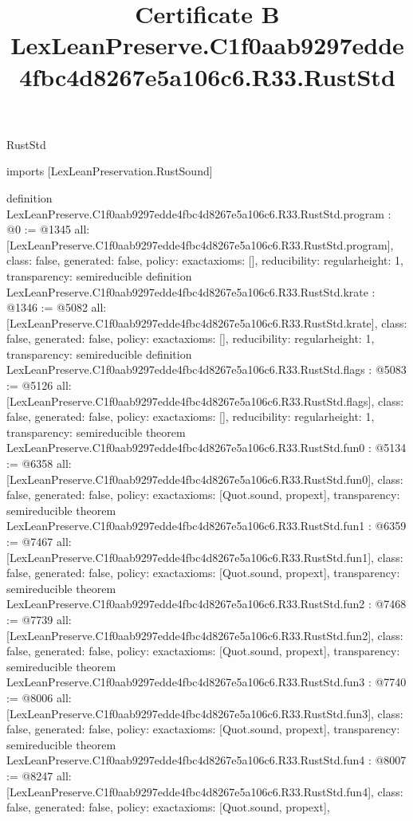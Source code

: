 \begin{lexlean}{RustStd}
\title{Certificate B LexLeanPreserve.C1f0aab9297edde4fbc4d8267e5a106c6.R33.RustStd}
\begin{coremodule}
imports [LexLeanPreservation.RustSound]

definition LexLeanPreserve.C1f0aab9297edde4fbc4d8267e5a106c6.R33.RustStd.program : @0 := @1345 {
  all: [LexLeanPreserve.C1f0aab9297edde4fbc4d8267e5a106c6.R33.RustStd.program],
  class: false,
  generated: false,
  policy: exact{axioms: []},
  reducibility: regular{height: 1},
  transparency: semireducible
}
definition LexLeanPreserve.C1f0aab9297edde4fbc4d8267e5a106c6.R33.RustStd.krate : @1346 := @5082 {
  all: [LexLeanPreserve.C1f0aab9297edde4fbc4d8267e5a106c6.R33.RustStd.krate],
  class: false,
  generated: false,
  policy: exact{axioms: []},
  reducibility: regular{height: 1},
  transparency: semireducible
}
definition LexLeanPreserve.C1f0aab9297edde4fbc4d8267e5a106c6.R33.RustStd.flags : @5083 := @5126 {
  all: [LexLeanPreserve.C1f0aab9297edde4fbc4d8267e5a106c6.R33.RustStd.flags],
  class: false,
  generated: false,
  policy: exact{axioms: []},
  reducibility: regular{height: 1},
  transparency: semireducible
}
theorem LexLeanPreserve.C1f0aab9297edde4fbc4d8267e5a106c6.R33.RustStd.fun0 : @5134 := @6358 {
  all: [LexLeanPreserve.C1f0aab9297edde4fbc4d8267e5a106c6.R33.RustStd.fun0],
  class: false,
  generated: false,
  policy: exact{axioms: [Quot.sound, propext]},
  transparency: semireducible
}
theorem LexLeanPreserve.C1f0aab9297edde4fbc4d8267e5a106c6.R33.RustStd.fun1 : @6359 := @7467 {
  all: [LexLeanPreserve.C1f0aab9297edde4fbc4d8267e5a106c6.R33.RustStd.fun1],
  class: false,
  generated: false,
  policy: exact{axioms: [Quot.sound, propext]},
  transparency: semireducible
}
theorem LexLeanPreserve.C1f0aab9297edde4fbc4d8267e5a106c6.R33.RustStd.fun2 : @7468 := @7739 {
  all: [LexLeanPreserve.C1f0aab9297edde4fbc4d8267e5a106c6.R33.RustStd.fun2],
  class: false,
  generated: false,
  policy: exact{axioms: [Quot.sound, propext]},
  transparency: semireducible
}
theorem LexLeanPreserve.C1f0aab9297edde4fbc4d8267e5a106c6.R33.RustStd.fun3 : @7740 := @8006 {
  all: [LexLeanPreserve.C1f0aab9297edde4fbc4d8267e5a106c6.R33.RustStd.fun3],
  class: false,
  generated: false,
  policy: exact{axioms: [Quot.sound, propext]},
  transparency: semireducible
}
theorem LexLeanPreserve.C1f0aab9297edde4fbc4d8267e5a106c6.R33.RustStd.fun4 : @8007 := @8247 {
  all: [LexLeanPreserve.C1f0aab9297edde4fbc4d8267e5a106c6.R33.RustStd.fun4],
  class: false,
  generated: false,
  policy: exact{axioms: [Quot.sound, propext]},
}
\end{coremodule}
\end{lexlean}
